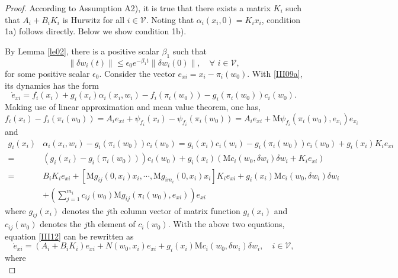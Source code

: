 \documentclass[onecolumn,a4paper,12pt]{article}
\numberwithin{equation}{section}
\begin{document}
\begin{proof}
According to Assumption A2), it is true that there exists a matrix $K_i$ such that $A_i+B_iK_i$ is Hurwitz for all $i\in\mathcal{V}$. Noting that $\alpha_i(x_i,0)=K_ix_i$, condition 1a) follows directly. Below we show condition 1b).

By Lemma \ref{le02}, there is a positive scalar $\beta_1$ such that
\begin{equation} \label{III11}
  \|\delta w_i(t)\| \le \epsilon_0 e^{-\beta_1t}\|\delta w_i(0)\|, \quad \forall\,\, i\in\mathcal{V},
\end{equation}
for some positive scalar $\epsilon_0$. Consider the vector $e_{xi}=x_i-\pi_i(w_0)$. With \eqref{III09a}, its dynamics has the form
\begin{equation} \label{III12}
  \dot{e}_{xi}=f_i(x_i)+g_i(x_i)\alpha_i(x_i,w_i)-f_i(\pi_i(w_0))-g_i(\pi_i(w_0))c_i(w_0).
\end{equation}
Making use of linear approximation and mean value theorem, one has,
\begin{equation}
  f_i(x_i)-f_i(\pi_i(w_0))=A_ie_{xi}+\psi_{f_i}(x_i)-\psi_{f_i}(\pi_i(w_0)) = A_ie_{xi}+\mathrm{M}\psi_{f_i}(\pi_i(w_0),e_{x_i})e_{x_i}
\end{equation}
and
\begin{equation}
\begin{split}
 g_i(x_i)&\alpha_i(x_i,w_i)-g_i(\pi_i(w_0))c_i(w_0)
 = g_i(x_i)c_i(w_i)-g_i(\pi_i(w_0))c_i(w_0)+g_i(x_i)K_ie_{xi}\\
 =&(g_i(x_i)-g_i(\pi_i(w_0)))c_i(w_0)+g_i(x_i)(\mathrm{M}c_i(w_0,\delta{w_i})\delta{w_i}+K_ie_{xi})\\
 =&B_iK_ie_{xi}+
  \left[\mathrm{M}g_{ij}(0,x_i)x_i,\cdots, \mathrm{M}g_{im_i}(0,x_i)x_i\right]K_ie_{xi}+ g_i(x_i)\mathrm{M}c_i(w_0,\delta{w_i})\delta{w_i}
 \\& +\left(\sum_{j=1}^{m_i} c_{ij}(w_0)\mathrm{M}g_{ij}(\pi_i(w_0),e_{xi})\right)e_{xi}
 \end{split}
\end{equation}
where $g_{ij}(x_i)$ denotes the $j$th column vector of matrix function $g_i(x_i)$ and $c_{ij}(w_0)$ denotes the $j$th element of $c_i(w_0)$. With the above two equations, equation \eqref{III12} can be rewritten as
\begin{equation}
  \dot{e}_{xi}=(A_i+B_iK_i)e_{xi}+ N(w_0,x_i)e_{xi}+g_i(x_i)\mathrm{M}c_i(w_0,\delta w_i)\delta w_i, \quad i\in\mathcal{V},
\end{equation}
where
\begin{equation}

\end{equation}
\end{proof}
\end{document}
